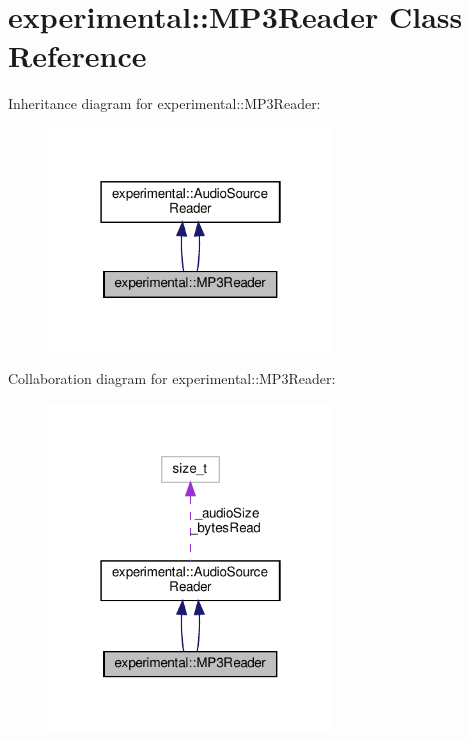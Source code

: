 \hypertarget{classexperimental_1_1MP3Reader}{}\section{experimental\+:\+:M\+P3\+Reader Class Reference}
\label{classexperimental_1_1MP3Reader}


Inheritance diagram for experimental\+:\+:M\+P3\+Reader\+:
\nopagebreak
\begin{figure}[H]
\begin{center}
\leavevmode
\includegraphics[width=214pt]{classexperimental_1_1MP3Reader__inherit__graph}
\end{center}
\end{figure}


Collaboration diagram for experimental\+:\+:M\+P3\+Reader\+:
\nopagebreak
\begin{figure}[H]
\begin{center}
\leavevmode
\includegraphics[width=214pt]{classexperimental_1_1MP3Reader__coll__graph}
\end{center}
\end{figure}

